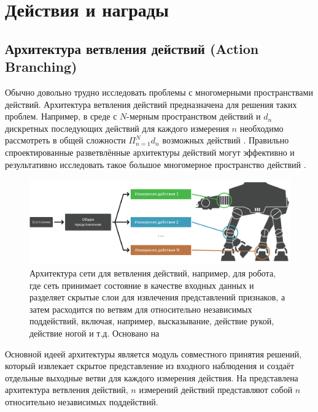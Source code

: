 \section{Действия и награды} \label{ch2:act-rew} %

\subsection{Архитектура ветвления действий (Action Branching)}

Обычно довольно трудно исследовать проблемы с многомерными пространствами действий. Архитектура ветвления действий предназначена для решения таких проблем. Например, в среде с $N$-мерным пространством действий и $d_n$ дискретных последующих действий для каждого измерения $n$ необходимо рассмотреть в общей сложности $\Pi^N_{n=1} d_n$ возможных действий \cite{tavakoli2017action}. Правильно спроектированные разветвлённые архитектуры действий могут эффективно и результативно исследовать такое большое многомерное пространство действий \cite{tavakoli2017action}.

\begin{figure}[ht!]
    \center
    \includegraphics [scale=0.4] {my_folder/images/ch2/action-branching.png}
    \caption{Архитектура сети для ветвления действий, например, для робота, где сеть принимает состояние в качестве входных данных и разделяет скрытые слои для извлечения представлений признаков, а затем расходится по ветвям для относительно независимых поддействий, включая, например, высказывание, действие рукой, действие ногой и т.д. Основано на \cite{tavakoli2017action}}
    \label{fig:ch2-action-branching}
\end{figure}

Основной идеей архитектуры является модуль совместного принятия решений, который извлекает скрытое представление из входного наблюдения и создаёт отдельные выходные ветви для каждого измерения действия. На  представлена архитектура ветвления действий, $n$ измерений действий представляют собой $n$ относительно независимых поддействий.

